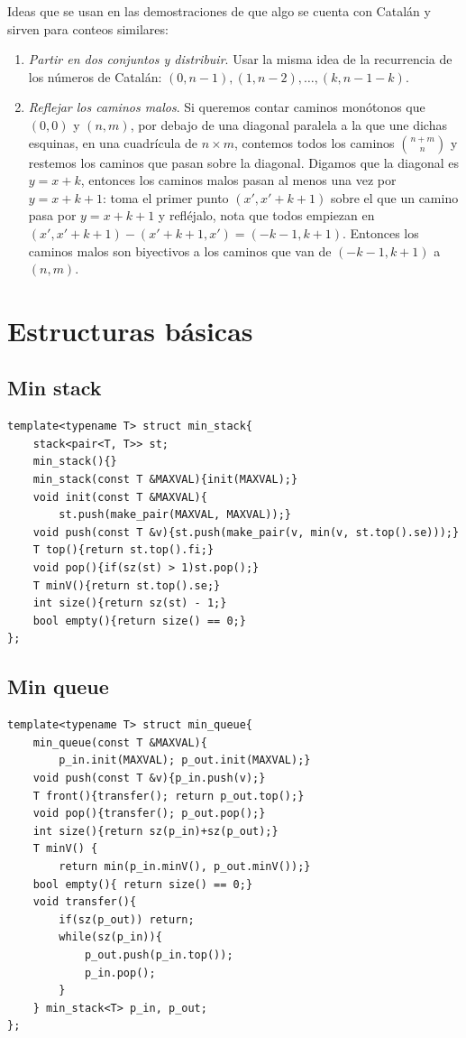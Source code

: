 \documentclass[10pt,spanish,mexico]{article}
\numberwithin{equation}{section}
\begin{document}
\begin{multicols}{2}
Ideas que se usan en las demostraciones de que algo se cuenta con Catalán y sirven para conteos similares:
\begin{enumerate}[1.]
    \item \textit{Partir en dos conjuntos y distribuir}. Usar la misma idea de la recurrencia de los números de Catalán: $(0, n - 1), (1, n - 2), \dots, (k, n - 1 - k)$.
    \item \textit{Reflejar los caminos malos}. Si queremos contar caminos monótonos que $(0, 0)$ y $(n, m)$, por debajo de una diagonal paralela a la que une dichas esquinas, en una cuadrícula de $n \times m$, contemos todos los caminos $\binom{n + m}{n}$ y restemos los caminos que pasan sobre la diagonal. Digamos que la diagonal es $y = x + k$, entonces los caminos malos pasan al menos una vez por $y = x + k + 1$: toma el primer punto $(x', x' + k + 1)$ sobre el que un camino pasa por $y = x + k + 1$ y refléjalo, nota que todos empiezan en $(x', x' + k + 1) - (x' + k + 1, x') = (- k - 1, k + 1)$. Entonces los caminos malos son biyectivos a los caminos que van de $(- k - 1, k + 1)$ a $(n, m)$.
\end{enumerate}

\hrulefill
\section{Estructuras básicas}
\subsection{Min stack}
\begin{verbatim}
template<typename T> struct min_stack{
    stack<pair<T, T>> st;
    min_stack(){}
    min_stack(const T &MAXVAL){init(MAXVAL);}
    void init(const T &MAXVAL){
        st.push(make_pair(MAXVAL, MAXVAL));}
    void push(const T &v){st.push(make_pair(v, min(v, st.top().se)));}
    T top(){return st.top().fi;}
    void pop(){if(sz(st) > 1)st.pop();}
    T minV(){return st.top().se;}
    int size(){return sz(st) - 1;}
    bool empty(){return size() == 0;}
};
\end{verbatim}

\vspace{-1.2\baselineskip}
\hrulefill
\subsection{Min queue}
\begin{verbatim}
template<typename T> struct min_queue{
    min_queue(const T &MAXVAL){
        p_in.init(MAXVAL); p_out.init(MAXVAL);}
    void push(const T &v){p_in.push(v);}
    T front(){transfer(); return p_out.top();}
    void pop(){transfer(); p_out.pop();}
    int size(){return sz(p_in)+sz(p_out);}
    T minV() {
        return min(p_in.minV(), p_out.minV());}
    bool empty(){ return size() == 0;}
    void transfer(){
        if(sz(p_out)) return;
        while(sz(p_in)){
            p_out.push(p_in.top());
            p_in.pop();
        }
    } min_stack<T> p_in, p_out;
};
\end{verbatim}


\end{multicols}
\end{document}
